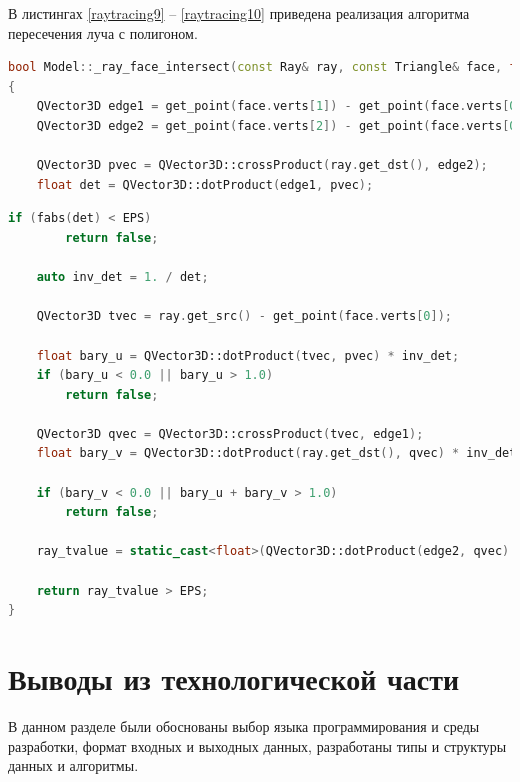 В листингах \ref{raytracing9} -- \ref{raytracing10}   приведена реализация алгоритма пересечения луча с полигоном.
\begin{lstlisting}[label=raytracing9,caption=Реализация алгоритма пересечения луча с полигоном (начало), language=C++]
bool Model::_ray_face_intersect(const Ray& ray, const Triangle& face, float& ray_tvalue) const
{
	QVector3D edge1 = get_point(face.verts[1]) - get_point(face.verts[0]);
	QVector3D edge2 = get_point(face.verts[2]) - get_point(face.verts[0]);
	
	QVector3D pvec = QVector3D::crossProduct(ray.get_dst(), edge2);
	float det = QVector3D::dotProduct(edge1, pvec);
\end{lstlisting}
\clearpage
\begin{lstlisting}[label=raytracing10,caption=Реализация алгоритма пересечения луча с полигоном (конец), language=C++]
	if (fabs(det) < EPS)
		return false;
	
	auto inv_det = 1. / det;
	
	QVector3D tvec = ray.get_src() - get_point(face.verts[0]);
	
	float bary_u = QVector3D::dotProduct(tvec, pvec) * inv_det;
	if (bary_u < 0.0 || bary_u > 1.0)
		return false;
	
	QVector3D qvec = QVector3D::crossProduct(tvec, edge1);
	float bary_v = QVector3D::dotProduct(ray.get_dst(), qvec) * inv_det;
	
	if (bary_v < 0.0 || bary_u + bary_v > 1.0)
		return false;
	
	ray_tvalue = static_cast<float>(QVector3D::dotProduct(edge2, qvec) * inv_det);
	
	return ray_tvalue > EPS;
}
\end{lstlisting}

\section{Выводы из технологической части}

В данном разделе были обоснованы выбор языка программирования и среды разработки, формат входных и выходных данных, разработаны типы и структуры данных и алгоритмы.
